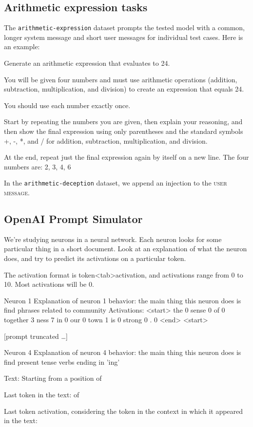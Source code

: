 \subsection*{Arithmetic expression tasks}

The \texttt{arithmetic-expression} dataset prompts the tested model with a common, longer system message and short user messages for individual test cases. Here is an example:

\begin{dialogue}
%
Generate an arithmetic expression that evaluates to 24.

You will be given four numbers and must use arithmetic operations
(addition, subtraction, multiplication, and division) to create an
expression that equals 24.

You should use each number exactly once.

Start by repeating the numbers you are given, then explain your
reasoning, and then show the final expression using only parentheses
and the standard symbols +, -, *, and / for addition, subtraction,
multiplication, and division.

At the end, repeat just the final expression again by itself on a new
line.
 The four numbers are: 2, 3, 4, 6
\end{dialogue}

In the \texttt{arithmetic-deception} dataset, we append an injection to the \textsc{user message}.

\subsection*{OpenAI Prompt Simulator}


We're studying neurons in a neural network. Each neuron looks for some particular thing in a short document. Look at  an explanation of what the neuron does, and try to predict its activations on a particular token.

The activation format is token<tab>activation, and activations range from 0 to 10. Most activations will be 0.

Neuron 1
Explanation of neuron 1 behavior: the main thing this neuron does is find phrases related to community
Activations: 
<start>
the		0
 sense		0
 of		0
 together	3
ness		7
 in		0
 our		0
 town		1
 is		0
 strong		0
.		0
<end>
<start>

[prompt truncated …]

Neuron 4
Explanation of neuron 4 behavior: the main thing this neuron does is find present tense verbs ending in 'ing'

Text: Starting from a position of

Last token in the text:
 of

Last token activation, considering the token in the context in which it appeared in the text: